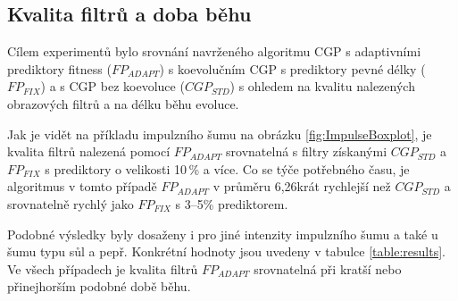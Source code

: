 \documentclass[fleqn,11pt]{ExcelAtFIT} %
\begin{document}

\subsection{Kvalita filtrů a doba běhu}

Cílem experimentů bylo srovnání navrženého algoritmu CGP s adaptivními prediktory fitness ($\mathit{FP_{ADAPT}}$) s koevolučním CGP s prediktory pevné délky ($\mathit{FP_{FIX}}$) a s CGP bez koevoluce ($\mathit{CGP_{STD}}$) s ohledem na kvalitu nalezených obrazových filtrů a na délku běhu evoluce.


Jak je vidět na příkladu impulzního šumu na obrázku \ref{fig:ImpulseBoxplot}, je kvalita filtrů nalezená pomocí $\mathit{FP_{ADAPT}}$ srovnatelná s filtry získanými $\mathit{CGP_{STD}}$ a $\mathit{FP_{FIX}}$ s prediktory o velikosti 10\,\% a více. Co se týče potřebného času, je algoritmus v tomto případě $\mathit{FP_{ADAPT}}$ v průměru 6,26krát rychlejší než $\mathit{CGP_{STD}}$ a srovnatelně rychlý jako $\mathit{FP_{FIX}}$ s 3--5\% prediktorem.

Podobné výsledky byly dosaženy i pro jiné intenzity impulzního šumu a také u šumu typu sůl a pepř. Konkrétní hodnoty jsou uvedeny v tabulce \ref{table:results}. Ve všech případech je kvalita filtrů $\mathit{FP_{ADAPT}}$ srovnatelná při kratší nebo přinejhorším podobné době běhu.



\end{document}
